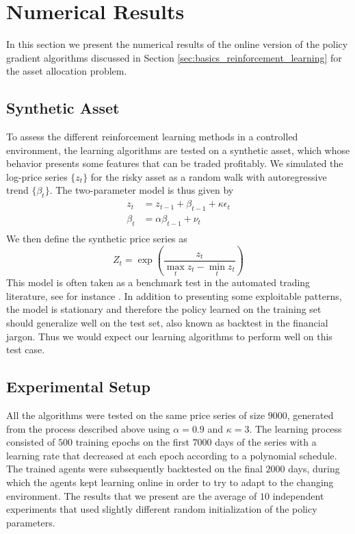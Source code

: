 \section{Numerical Results}
\label{sec:numerical_results}

In this section we present the numerical results of the online version of the policy gradient algorithms discussed in Section \ref{sec:basics_reinforcement_learning} for the asset allocation problem. 

\subsection{Synthetic Asset}
To assess the different reinforcement learning methods in a controlled environment, the learning algorithms are tested on a synthetic asset, which whose behavior presents some features that can be traded profitably. We simulated the log-price series $\{z_t\}$ for the risky asset as a random walk with autoregressive trend $\{\beta_t\}$. The two-parameter model is thus given by
\begin{equation}
	\begin{split}
		z_t &= z_{t-1} + \beta_{t-1} + \kappa \epsilon_t\\
		\beta_t &= \alpha \beta_{t-1} + \nu_t\\
	\end{split}
\end{equation}
We then define the synthetic price series as
\begin{equation}
	Z_t = \exp\left(\frac{z_t}{\max_t z_t - \min_t z_t}\right)
\end{equation}
This model is often taken as a benchmark test in the automated trading literature, see for instance \cite{moody1998performance}. In addition to presenting some exploitable patterns, the model is stationary and therefore the policy learned on the training set should generalize well on the test set, also known as backtest in the financial jargon. Thus we would expect our learning algorithms to perform well on this test case. 

\subsection{Experimental Setup}   
All the algorithms were tested on the same price series of size $9000$, generated from the process described above using $\alpha = 0.9$ and $\kappa = 3$. The learning process consisted of $500$ training epochs on the first $7000$ days of the series with a learning rate that decreased at each epoch according to a polynomial schedule. The trained agents were subsequently backtested on the final $2000$ days, during which the agents kept learning online in order to try to adapt to the changing environment. The results that we present are the average of $10$ independent experiments that used slightly different random initialization of the policy parameters.   


